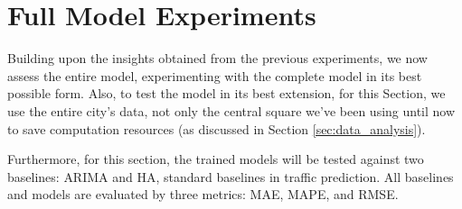 \section{Full Model Experiments}

Building upon the insights obtained from the previous experiments, we now assess the entire model, experimenting with the complete model in its best possible form. Also, to test the model in its best extension, for this Section, we use the entire city's data, not only the central square we've been using until now to save computation resources (as discussed in Section \ref{sec:data_analysis}).

Furthermore, for this section, the trained models will be tested against two baselines: \gls{ARIMA} and \gls{HA}, standard baselines in traffic prediction. All baselines and models are evaluated by three metrics: \gls{MAE}, \gls{MAPE}, and \gls{RMSE}.
